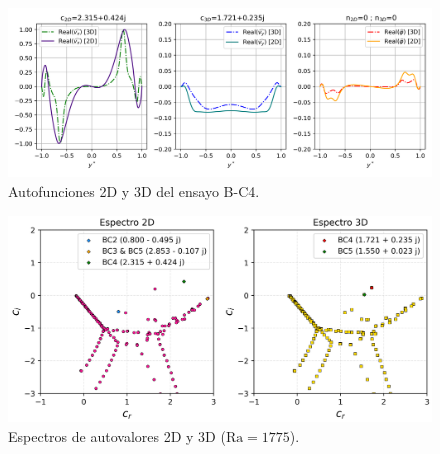\begin{figure}[H]
  \centering  
    \includegraphics[width=\textwidth]{figures/apendices/transicion/Re5000-Ri1Em4-Pr071_eigenfun_BC4.png}
  \caption{Autofunciones 2D y 3D del ensayo B-C4.}
  \label{fig:eigenfuns3-Re5000-Pr071}
\end{figure}

\begin{figure}[H]
  \centering
    \includegraphics[width=\textwidth]{figures/apendices/transicion/Re5000-Pr071-Ri1Em4_eigenvals.png}
  \caption{Espectros de autovalores 2D y 3D ($\text{Ra}=1775$).}
  \label{fig:spectra-Re5000-Pr0071}
\end{figure}



